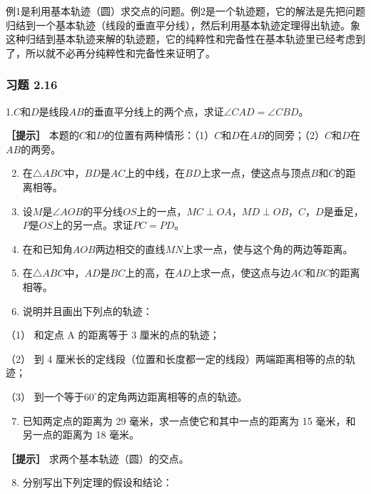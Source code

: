 例1是利用基本轨迹（圆）求交点的问题。例2是一个轨迹题，它的解法是先把问题归结到一个基本轨迹（线段的垂直平分线），然后利用基本轨迹定理得出轨迹。象这种归结到基本轨迹来解的轨迹题，它的纯粹性和完备性在基本轨迹里已经考虑到了，所以就不必再分纯粹性和完备性来证明了。

\subsubsection{习题 2.16}

1.\(C\)和\(D\)是线段\(AB\)的垂直平分线上的两个点，求证\(\angle CAD = \angle CBD\)。

\textbf{［提示］}
本题的\(C\)和\(D\)的位置有两种情形：（1）\(C\)和\(D\)在\(AB\)的同旁；（2）\(C\)和\(D\)在\(AB\)的两旁。

\begin{enumerate}
\setcounter{enumi}{1}
\item
  在\(\triangle ABC\)中，\(BD\)是\(AC\)上的中线，在\(BD\)上求一点，使这点与顶点\(B\)和\(C\)的距离相等。
\item
  设\(M\)是\(\angle AOB\)的平分线\(OS\)上的一点，\(MC \perp OA\)，\(MD \perp OB\)，\(C\)，\(D\)是垂足，\(P\)是\(OS\)上的另一点。求证\(PC = PD\)。
\item
  在和已知角\(AOB\)两边相交的直线\(MN\)上求一点，使与这个角的两边等距离。
\item
  在\(\triangle ABC\)中，\(AD\)是\(BC\)上的高，在\(AD\)上求一点，使这点与边\(AC\)和\(BC\)的距离相等。
\item
  说明并且画出下列点的轨迹：
\end{enumerate}

（1） 和定点 A 的距离等于 3 厘米的点的轨迹；

（2） 到 4
厘米长的定线段（位置和长度都一定的线段）两端距离相等的点的轨迹；

（3） 到一个等于\(60^{\circ}\)的定角两边距离相等的点的轨迹。

\begin{enumerate}
\setcounter{enumi}{6}
\item
  已知两定点的距离为 29 毫米，求一点使它和其中一点的距离为 15
  毫米，和另一点的距离为 18 毫米。
\end{enumerate}

\textbf{［提示］} 求两个基本轨迹（圆）的交点。

\begin{enumerate}
\setcounter{enumi}{7}
\item
  分别写出下列定理的假设和结论：
\end{enumerate}

